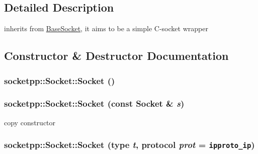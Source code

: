\subsection{Detailed Description}
inherits from \hyperlink{classsocketpp_1_1BaseSocket}{BaseSocket}, it aims to be a simple C-socket wrapper 

\subsection{Constructor \& Destructor Documentation}
\hypertarget{classsocketpp_1_1Socket_6e64543f53184332b55289935f2fd35d}{
\subsubsection[{Socket}]{\setlength{\rightskip}{0pt plus 5cm}socketpp::Socket::Socket ()}}
\label{classsocketpp_1_1Socket_6e64543f53184332b55289935f2fd35d}


\hypertarget{classsocketpp_1_1Socket_799a836f2ceab366ab11ae234970d951}{
\subsubsection[{Socket}]{\setlength{\rightskip}{0pt plus 5cm}socketpp::Socket::Socket (const {\bf Socket} \& {\em s})}}
\label{classsocketpp_1_1Socket_799a836f2ceab366ab11ae234970d951}


copy constructor 

\hypertarget{classsocketpp_1_1Socket_c10e4f533ed78a3d898c1fe0cea09cef}{
\subsubsection[{Socket}]{\setlength{\rightskip}{0pt plus 5cm}socketpp::Socket::Socket ({\bf type} {\em t}, \/  {\bf protocol} {\em prot} = {\tt ipproto\_\-ip})}}
\label{classsocketpp_1_1Socket_c10e4f533ed78a3d898c1fe0cea09cef}


